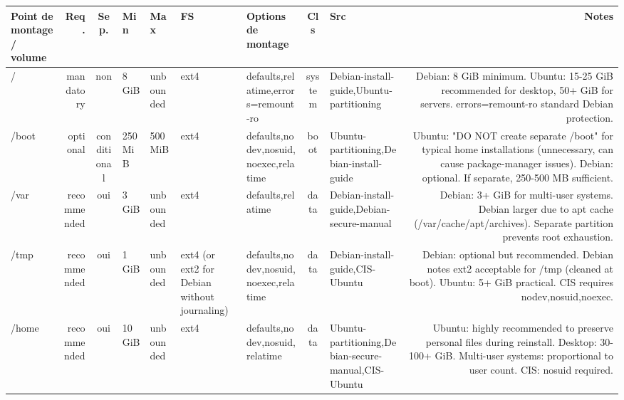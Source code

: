 \documentclass[10pt,a4paper]{article}
\renewcommand{\arraystretch}{1.2}
\begin{document}
{\renewcommand{\arraystretch}{1.15}\begin{longtable}{M R S Z Z T O C I N}\toprule\textbf{\normalfont\scriptsize Point de montage / volume} & \textbf{\normalfont\scriptsize Req.} & \textbf{\normalfont\scriptsize Sep.} & \textbf{\normalfont\scriptsize Min} & \textbf{\normalfont\scriptsize Max} & \textbf{\normalfont\scriptsize FS} & \textbf{\normalfont\scriptsize Options de montage} & \textbf{\normalfont\scriptsize Cls} & \textbf{\normalfont\scriptsize Src} & \textbf{\normalfont\scriptsize Notes}\\\midrule\endhead
/ & \textcolor{cBlock}{mandatory} & non & 8 GiB & unbounded & ext4 & defaults,relatime,errors=remount-ro & system & Debian-install-guide,Ubuntu-partitioning & Debian: 8 GiB minimum. Ubuntu: 15-25 GiB recommended for desktop, 50+ GiB for servers. errors=remount-ro standard Debian protection.\\
/boot & \textcolor{cLow}{optional} & conditional & 250 MiB & 500 MiB & ext4 & defaults,nodev,nosuid,noexec,relatime & boot & Ubuntu-partitioning,Debian-install-guide & Ubuntu: "DO NOT create separate /boot" for typical home installations (unnecessary, can cause package-manager issues). Debian: optional. If separate, 250-500 MB sufficient.\\
/var & \textcolor{cHigh}{recommended} & \textcolor{cOk}{oui} & 3 GiB & unbounded & ext4 & defaults,relatime & data & Debian-install-guide,Debian-secure-manual & Debian: 3+ GiB for multi-user systems. Debian larger due to apt cache (/var/cache/apt/archives). Separate partition prevents root exhaustion.\\
/tmp & \textcolor{cHigh}{recommended} & \textcolor{cOk}{oui} & 1 GiB & unbounded & ext4 (or ext2 for Debian without journaling) & defaults,nodev,nosuid,noexec,relatime & data & Debian-install-guide,CIS-Ubuntu & Debian: optional but recommended. Debian notes ext2 acceptable for /tmp (cleaned at boot). Ubuntu: 5+ GiB practical. CIS requires nodev,nosuid,noexec.\\
/home & \textcolor{cHigh}{recommended} & \textcolor{cOk}{oui} & 10 GiB & unbounded & ext4 & defaults,nodev,nosuid,relatime & data & Ubuntu-partitioning,Debian-secure-manual,CIS-Ubuntu & Ubuntu: highly recommended to preserve personal files during reinstall. Desktop: 30-100+ GiB. Multi-user systems: proportional to user count. CIS: nosuid required.\\
\bottomrule\end{longtable}}
\end{document}
